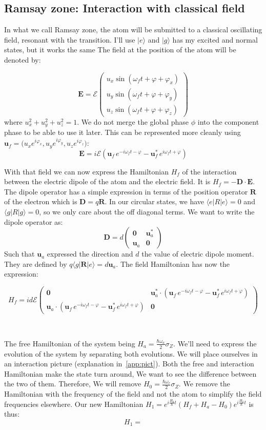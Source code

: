 \documentclass[10pt]{report}
\theoremstyle{plain}
\theoremstyle{definition}
\theoremstyle{remark}
\newcommand{\ket}[1]{|#1\rangle}
\newcommand{\bra}[1]{\langle#1|}
\newcommand{\mat}[1]{\begin{pmatrix}#1\end{pmatrix}}
\newcommand{\bs}{\boldsymbol}
\begin{document}
\subsection{Ramsay zone: Interaction with classical field}

In what we call Ramsay zone, the atom will be submitted to a classical oscillating
field, resonant with the transition. I'll use $\ket e$ and $\ket g$ has my
excited and normal states, but it works the same The field at the position of the atom will
be denoted by:

\[\bs E = \mathcal{E}
  \mat{u_x\sin(\omega_f t + \varphi + \varphi_x)\\
    u_y\sin(\omega_f t + \varphi + \varphi_y)\\
    u_z\sin(\omega_f t + \varphi + \varphi_z)}\]
where $u_x^2 + u_y^2 +u_z^2 = 1$. We do not merge the global phase $\phi$ into
the component phase to be able to use it later. This can be represented more
cleanly using $\bs u_f = \big(u_x e^{i\varphi_x},u_y e^{i\varphi_y},u_z
e^{i\varphi_z}\big)$:
\[\bs E = i\mathcal{E} (\bs u_f\, e^{-i\omega_f t-\varphi} - \bs u_f^*\,
  e^{i\omega_f t + \varphi})\]

With that field we can now express the Hamiltonian $H_f$ of the
interaction between the electric dipole of the
atom and the electric field. It is $H_f = - \bs D \cdot \bs E$.
The dipole operator has a simple expression in terms
of the position operator $\bs R$ of the electron which is $\bs D = q \bs R$.
In our circular states, we have $\bra e R \ket e = 0$ and $\bra g R \ket g = 0$,
so we only care about the off diagonal terms. We want to write the dipole
operator as:
\[\bs D = d\mat{\bs 0&\bs u_a^*\\\bs u_a&\bs 0}\]
Such that $\bs u_a$ expressed the direction and $d$ the value of electric dipole
moment. They are defined by $ q \bra g \bs R \ket e = d \bs u_a$. The field
Hamiltonian has now the expression:

\[ H_f = id\mathcal{E} \mat{\bs 0 &
  \bs u_a^* \cdot (\bs u_f\, e^{-i\omega_f t-\varphi} - \bs u_f^*\,
  e^{i\omega_f t + \varphi})\\
\bs u_a \cdot (\bs u_f\, e^{-i\omega_f t-\varphi} - \bs u_f^*\,
  e^{i\omega_f t + \varphi}) & \bs 0
}\]

\

The free Hamiltonian of the system being $H_a = \frac{\hbar \omega_a}2 \sigma_Z$.
We'll need to express the evolution of the system by separating both evolutions.
We will place ourselves in an interaction picture (explanation
in~\cref{app:pict}). Both the free and interaction Hamiltonian make the state turn
around, We want to see the difference between the two of them. Therefore, We
will remove $H_0 = \frac{\hbar \omega_r}2 \sigma_Z$. We remove the Hamiltonian
with the frequency of the field and not the atom to simplify the field
frequencies elsewhere. Our new Hamiltonian $H_1 = e^{i\frac{H_0}\hbar t}(H_f + H_a - H_0)e^{i\frac{H_0}\hbar t}$ is thus:
\[H_1 =  \]
\end{document}
